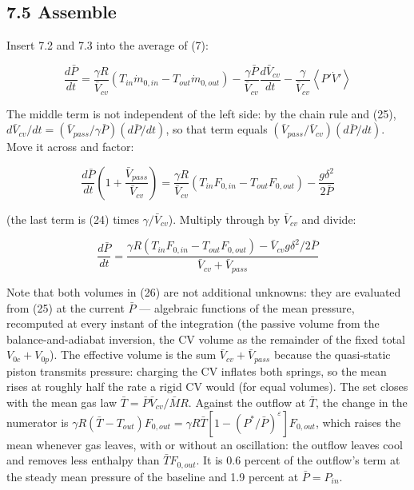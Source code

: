 \documentclass[11pt]{article}
\begin{document}
\subsection*{7.5 Assemble}

Insert 7.2 and 7.3 into the average of (7):

\[
\frac{d\bar P}{dt} = \frac{\gamma R}{\bar V_{cv}}\left(T_{in}\dot m_{0,in} - T_{out}\dot m_{0,out}\right) - \frac{\gamma\bar P}{\bar V_{cv}}\frac{d\bar V_{cv}}{dt} - \frac{\gamma}{\bar V_{cv}}\left\langle P'\dot V'\right\rangle
\]

The middle term is not independent of the left side: by the chain rule and (25), $d\bar V_{cv}/dt = (\bar V_{pass}/\gamma\bar P)(d\bar P/dt)$, so that term equals $(\bar V_{pass}/\bar V_{cv})(d\bar P/dt)$. Move it across and factor:

\[
\frac{d\bar P}{dt}\left(1 + \frac{\bar V_{pass}}{\bar V_{cv}}\right) = \frac{\gamma R}{\bar V_{cv}}\left(T_{in}F_{0,in} - T_{out}F_{0,out}\right) - \frac{g\delta^2}{2\bar P}
\]

(the last term is (24) times $\gamma/\bar V_{cv}$). Multiply through by $\bar V_{cv}$ and divide:

\begin{equation}
\frac{d\bar P}{dt} = \frac{\gamma R\left(T_{in}F_{0,in} - T_{out}F_{0,out}\right) - \bar V_{cv}g\delta^2/2\bar P}{\bar V_{cv} + \bar V_{pass}} \tag{26}
\end{equation}

Note that both volumes in (26) are not additional unknowns: they are evaluated from (25) at the current $\bar P$ --- algebraic functions of the mean pressure, recomputed at every instant of the integration (the passive volume from the balance-and-adiabat inversion, the CV volume as the remainder of the fixed total $V_{0c} + V_{0p}$). The effective volume is the sum $\bar V_{cv} + \bar V_{pass}$ because the quasi-static piston transmits pressure: charging the CV inflates both springs, so the mean rises at roughly half the rate a rigid CV would (for equal volumes). The set closes with the mean gas law $\bar T = \bar P\bar V_{cv}/\bar MR$. Against the outflow at $\bar T$, the change in the numerator is $\gamma R(\bar T - T_{out})F_{0,out} = \gamma R\bar T\left[1 - (P^*/\bar P)^{\varepsilon}\right]F_{0,out}$, which raises the mean whenever gas leaves, with or without an oscillation: the outflow leaves cool and removes less enthalpy than $\bar TF_{0,out}$. It is 0.6 percent of the outflow's term at the steady mean pressure of the baseline and 1.9 percent at $\bar P = P_{in}$.
\end{document}
